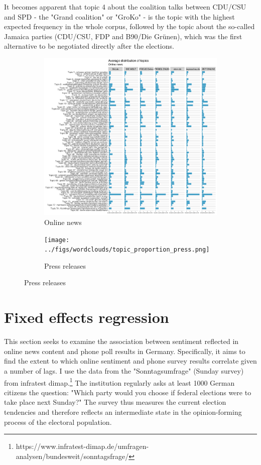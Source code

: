 \documentclass[12pt,a4paper,notitlepage]{article}
\begin{document}
It becomes apparent that topic 4 about the coalition talks between CDU/CSU and SPD - the "Grand coalition" or "GroKo" - is the topic with the highest expected frequency in the whole corpus, followed by the topic about the so-called Jamaica parties (CDU/CSU, FDP and B90/Die Grünen), which was the first alternative to be negotiated directly after the elections.  

\begin{figure}[H]\label{fig_wordcloud2}
	\caption{Expected frequency}
	\begin{center}
		\begin{subfigure}[normla]{0.48\textwidth}
			\includegraphics[width=\textwidth]{../figs/topic_proportion_news.png}
			\caption{Online news}
		\end{subfigure}
		\begin{subfigure}[normla]{0.48\textwidth}
			\texttt{[image: ../figs/wordclouds/topic\_proportion\_press.png]}
			\caption{Press releases}
		\end{subfigure}
	\end{center}
\end{figure}


\section{Fixed effects regression}\label{ch_results}

This section seeks to examine the association between sentiment reflected in online news content and phone poll results in Germany. Specifically, it aims to find the extent to which online sentiment and phone survey results correlate given a number of lags. I use the data from the "Sonntagsumfrage" (Sunday survey) from infratest dimap.\footnote{https://www.infratest-dimap.de/umfragen-analysen/bundesweit/sonntagsfrage/} The institution regularly asks at least 1000 German citizens the question: "Which party would you choose if federal elections were to take place next Sunday?" The survey thus measures the current election tendencies and therefore reflects an intermediate state in the opinion-forming process of the electoral population.
\end{document}
